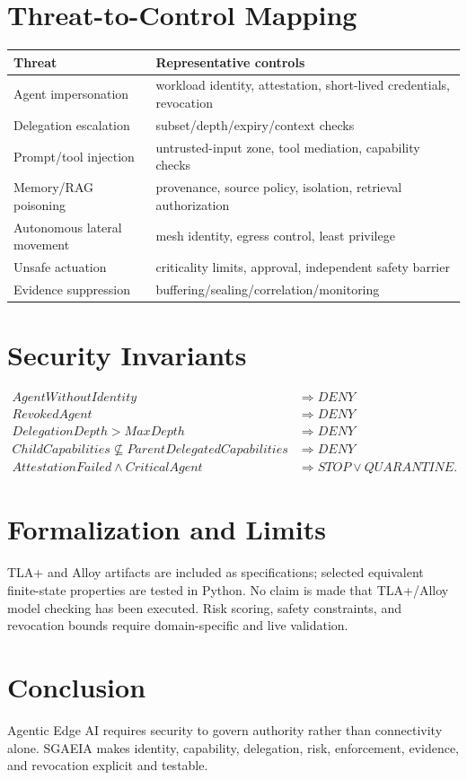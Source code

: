 \documentclass[11pt]{article}
\begin{document}
\section{Threat-to-Control Mapping}
\begin{longtable}{p{.28\linewidth}p{.62\linewidth}}\toprule Threat&Representative controls\\\midrule
Agent impersonation&workload identity, attestation, short-lived credentials, revocation\\
Delegation escalation&subset/depth/expiry/context checks\\
Prompt/tool injection&untrusted-input zone, tool mediation, capability checks\\
Memory/RAG poisoning&provenance, source policy, isolation, retrieval authorization\\
Autonomous lateral movement&mesh identity, egress control, least privilege\\
Unsafe actuation&criticality limits, approval, independent safety barrier\\
Evidence suppression&buffering/sealing/correlation/monitoring\\\bottomrule\end{longtable}

\section{Security Invariants}
\begin{align*}
AgentWithoutIdentity&\Rightarrow DENY\\
RevokedAgent&\Rightarrow DENY\\
DelegationDepth>MaxDepth&\Rightarrow DENY\\
ChildCapabilities\nsubseteq ParentDelegatedCapabilities&\Rightarrow DENY\\
AttestationFailed\land CriticalAgent&\Rightarrow STOP\lor QUARANTINE.
\end{align*}

\section{Formalization and Limits}
TLA+ and Alloy artifacts are included as specifications; selected equivalent finite-state properties are tested in Python. No claim is made that TLA+/Alloy model checking has been executed. Risk scoring, safety constraints, and revocation bounds require domain-specific and live validation.

\section{Conclusion}
Agentic Edge AI requires security to govern authority rather than connectivity alone. SGAEIA makes identity, capability, delegation, risk, enforcement, evidence, and revocation explicit and testable.
\end{document}
